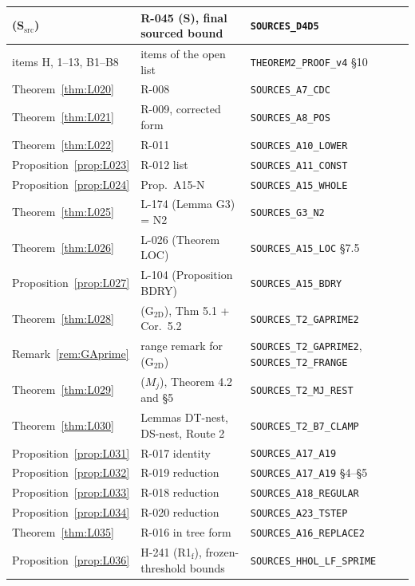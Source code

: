 \begin{longtable}{|p{4.2cm}|p{5.4cm}|p{5.4cm}|}
(S$_{\mathrm{src}}$) & R-045 (S), final sourced bound & \texttt{SOURCES\_D4D5} \\ \hline
items H, 1--13, B1--B8 & items of the open list & \texttt{THEOREM2\_PROOF\_v4} \S10 \\ \hline
Theorem~\ref{thm:L020} & R-008 & \texttt{SOURCES\_A7\_CDC} \\ \hline
Theorem~\ref{thm:L021} & R-009, corrected form & \texttt{SOURCES\_A8\_POS} \\ \hline
Theorem~\ref{thm:L022} & R-011 & \texttt{SOURCES\_A10\_LOWER} \\ \hline
Proposition~\ref{prop:L023} & R-012 list & \texttt{SOURCES\_A11\_CONST} \\ \hline
Proposition~\ref{prop:L024} & Prop.\ A15-N & \texttt{SOURCES\_A15\_WHOLE} \\ \hline
Theorem~\ref{thm:L025} & L-174 (Lemma G3) = N2 & \texttt{SOURCES\_G3\_N2} \\ \hline
Theorem~\ref{thm:L026} & L-026 (Theorem LOC) & \texttt{SOURCES\_A15\_LOC} \S7.5 \\ \hline
Proposition~\ref{prop:L027} & L-104 (Proposition BDRY) & \texttt{SOURCES\_A15\_BDRY} \\ \hline
Theorem~\ref{thm:L028} & (G$_{\mathrm{2D}}$), Thm 5.1 + Cor.\ 5.2 & \texttt{SOURCES\_T2\_GAPRIME2} \\ \hline
Remark~\ref{rem:GAprime} & range remark for (G$_{\mathrm{2D}}$) & \texttt{SOURCES\_T2\_GAPRIME2}, \texttt{SOURCES\_T2\_FRANGE} \\ \hline
Theorem~\ref{thm:L029} & ($M_j$), Theorem 4.2 and \S5 & \texttt{SOURCES\_T2\_MJ\_REST} \\ \hline
Theorem~\ref{thm:L030} & Lemmas DT-nest, DS-nest, Route 2 & \texttt{SOURCES\_T2\_B7\_CLAMP} \\ \hline
Proposition~\ref{prop:L031} & R-017 identity & \texttt{SOURCES\_A17\_A19} \\ \hline
Proposition~\ref{prop:L032} & R-019 reduction & \texttt{SOURCES\_A17\_A19} \S4--\S5 \\ \hline
Proposition~\ref{prop:L033} & R-018 reduction & \texttt{SOURCES\_A18\_REGULAR} \\ \hline
Proposition~\ref{prop:L034} & R-020 reduction & \texttt{SOURCES\_A23\_TSTEP} \\ \hline
Theorem~\ref{thm:L035} & R-016 in tree form & \texttt{SOURCES\_A16\_REPLACE2} \\ \hline
Proposition~\ref{prop:L036} & H-241 (R1$_{\mathrm f}$), frozen-threshold bounds & \texttt{SOURCES\_HHOL\_LF\_SPRIME} \\ \hline

\end{longtable}
